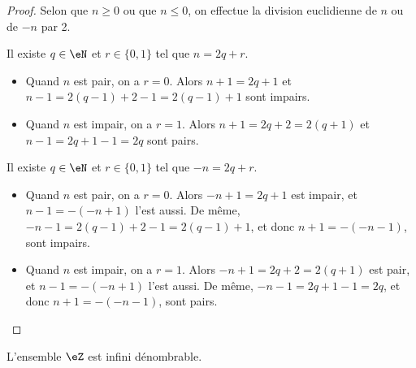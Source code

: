 \begin{proof}
	Selon que \( n \geq 0 \) ou que \( n \leq 0 \), on effectue la division euclidienne de \( n \) ou de \( -n \) par 2.
	\begin{subproof}
		Il existe \( q \in \eN \) et \( r \in \{ 0, 1\} \) tel que \( n = 2q+r \).
		\begin{itemize}
			\item
			      Quand \( n \) est pair, on a \( r = 0 \). Alors \( n+1 = 2q + 1 \) et \( n - 1 = 2(q-1) + 2 - 1 =  2(q-1) + 1 \) sont impairs.
			\item
			      Quand \( n \) est impair, on a \( r = 1 \). Alors \( n+1 = 2q + 2 = 2(q+1) \) et \( n - 1 = 2q + 1 - 1 =  2q \) sont pairs.
		\end{itemize}
		Il existe \( q \in \eN \) et \( r \in \{ 0, 1\} \) tel que \( -n = 2q+r \).
		\begin{itemize}
			\item
			      Quand \( n \) est pair, on a \( r = 0 \). Alors \( -n+1 = 2q + 1 \) est impair, et \( n-1 = -(-n+1) \) l'est aussi. De même, \( -n - 1 = 2(q-1) + 2 - 1 =  2(q-1) + 1 \), et donc \( n+1 = -(-n-1) \), sont impairs.
			\item
			      Quand \( n \) est impair, on a \( r = 1 \). Alors \( -n+1 = 2q + 2 = 2(q+1) \) est pair, et \( n-1 = -(-n+1) \) l'est aussi. De même, \( -n - 1 = 2q + 1 - 1 =  2q \), et donc \( n+1 = -(-n-1) \), sont pairs.
		\end{itemize}
	\end{subproof}
\end{proof}

\begin{lemma}       \label{LEMooJNXIooBmdOVi}
	L'ensemble \( \eZ\) est infini dénombrable.
\end{lemma}

